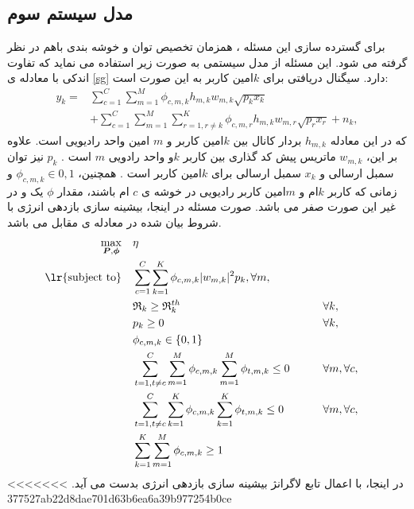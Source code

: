 \subsection{مدل سیستم سوم}
برای گسترده سازی این مسئله ، همزمان تخصیص توان و خوشه بندی باهم در نظر گرفته می شود.
این مسئله از مدل سیستمی به صورت زیر استفاده می نماید که تفاوت اندکی با معادله ی \eqref{sg} دارد.
سیگنال دریافتی برای $k$امین کاربر به این صورت است:
\begin{equation} \label{sg1}
\begin{aligned}
y_{k} =& \sum_{c=1}^C \sum_{m=1}^M  \phi_{c,m,k}h_{m,k}w_{m,k} \sqrt{p_k x_k} \\
&+ \sum_{c=1}^C \sum_{m=1}^M \sum_{r=1 ,r \neq k}^K  \phi_{c,m,r}h_{m,k}w_{m,r} \sqrt{p_r x_r} + n_k,
\end{aligned}	
\end{equation}
که در این معادله  $h_{m,k}$  بردار کانال بین $k$امین کاربر و $m$ امین  واحد رادیویی است.
علاوه بر این، $w_{m,k}$ ماتریس پیش کد گذاری بین کاربر $k$و واحد رادویی $m$ است . 
$p_k$ 
نیز توان سمبل ارسالی و
$x_k$
سمبل ارسالی برای $k$امین کاربر است .
همچنین، 
$ \phi_{c,m,k} \in {0,1}$ 
و زمانی که کاربر $k$ام و  $m$امین کاربر رادیویی در خوشه ی $c$ ام باشند، مقدار $\phi$ یک و در غیر این صورت صفر می باشد.
صورت مسئله در اینجا، بیشینه سازی بازدهی انرژی با شروط بیان شده در معادله ی  مقابل می باشد.
\begin{equation}
\begin{aligned}
\max\limits_{\boldsymbol{P},\boldsymbol{\phi}}   \quad &   \eta\\
\text{\lr{subject to}} \quad  & \sum_{c=1}^C \sum_{k=1}^K  \phi_{c,m,k}|w_{m,k}|^2 p_k , \forall m,   \\
&\mathfrak{R}_{k} \geq  \mathfrak{R}_{k}^{th} && \qquad  \forall k, \\
&p_{k}  \geq 0                                  &&\qquad  \forall k, \\
& \phi_{c,m,k} \in \{0,1\} \\
 &\sum_{t=1, t \neq c}^C \sum_{m=1}^M  \phi_{c,m,k}\sum_{m=1}^M \phi_{t,m,k} \leq 0    &&\qquad    \forall m  , \forall c, \\
  &\sum_{t=1, t \neq c}^C \sum_{k=1}^K  \phi_{c,m,k}\sum_{k=1}^K \phi_{t,m,k} \leq 0      &&\qquad      \forall m  , \forall c,\\
  &\sum_{k=1}^K \sum_{m=1}^M  \phi_{c,m,k} \geq 1\\
\end{aligned}	
\end{equation}
در اینجا، با اعمال تابع لاگرانژ بیشینه سازی بازدهی انرژی بدست می آید\cite{jointcluster,pcluster, jue}.
>>>>>>> 377527ab22d8dae701d63b6ea6a39b977254b0ce
